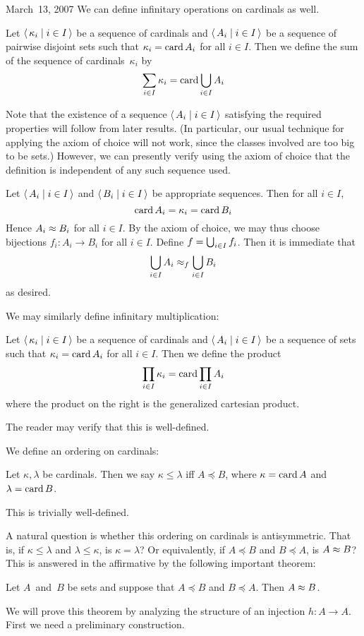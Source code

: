 \begin{lecture}{March~13, 2007}
We can define infinitary operations on cardinals as well.
\begin{defn}
Let \(\langle\,{\kappa_i}\mid{i\in I}\,\rangle\) be a sequence of cardinals and \(\langle\,{A_i}\mid{i\in I}\,\rangle\) be a sequence of pairwise disjoint sets such that \(\kappa_i=\operatorname{card} A_i\) for all \(i\in I\). Then we define the sum of the sequence of cardinals~\(\kappa_i\) by
\[\sum_{i\in I}\kappa_i=\operatorname{card}\bigcup_{i\in I}A_i\]
\end{defn}
\noindent Note that the existence of a sequence \(\langle\,{A_i}\mid{i\in I}\,\rangle\) satisfying the required properties will follow from later results. (In particular, our usual technique for applying the axiom of choice will not work, since the classes involved are too big to be sets.) However, we can presently verify using the axiom of choice that the definition is independent of any such sequence used.

Let \(\langle\,{A_i}\mid{i\in I}\,\rangle\) and \(\langle\,{B_i}\mid{i\in I}\,\rangle\) be appropriate sequences. Then for all \(i\in I\),
\[\operatorname{card}{A_i}=\kappa_i=\operatorname{card}{B_i}\]
Hence \(A_i\approx B_i\) for all \(i\in I\). By the axiom of choice, we may thus choose bijections \(f_i:A_i\to B_i\) for all \(i\in I\). Define \(f=\bigcup_{i\in I} f_i\). Then it is immediate that
\[\bigcup_{i\in I}A_i\approx_f\bigcup_{i\in I}B_i\]
as desired.

We may similarly define infinitary multiplication:
\begin{defn}
Let \(\langle\,{\kappa_i}\mid{i\in I}\,\rangle\) be a sequence of cardinals and \(\langle\,{A_i}\mid{i\in I}\,\rangle\) be a sequence of sets such that \(\kappa_i=\operatorname{card}{A_i}\) for all \(i\in I\). Then we define the product
\[\prod_{i\in I}\kappa_i=\operatorname{card}\prod_{i\in I}A_i\]
where the product on the right is the generalized cartesian product.
\end{defn}
\noindent The reader may verify that this is well-defined.

We define an ordering on cardinals:
\begin{defn}
Let \(\kappa,\lambda\) be cardinals. Then we say \(\kappa\le\lambda\) iff \(A\preceq B\), where \(\kappa=\operatorname{card} A\) and \(\lambda=\operatorname{card} B\).
\end{defn}
\noindent This is trivially well-defined.

A natural question is whether this ordering on cardinals is antisymmetric. That is, if \(\kappa\le\lambda\) and \(\lambda\le\kappa\), is \(\kappa=\lambda\)? Or equivalently, if \(A\preceq B\) and \(B\preceq A\), is \(A\approx B\)? This is answered in the affirmative by the following important theorem:
\begin{thm}
Let \(A\)~and~\(B\) be sets and suppose that \(A\preceq B\) and \(B\preceq A\). Then \(A\approx B\).
\end{thm}
\noindent We will prove this theorem by analyzing the structure of an injection \(h:A\to A\). First we need a preliminary construction.


\end{lecture}
